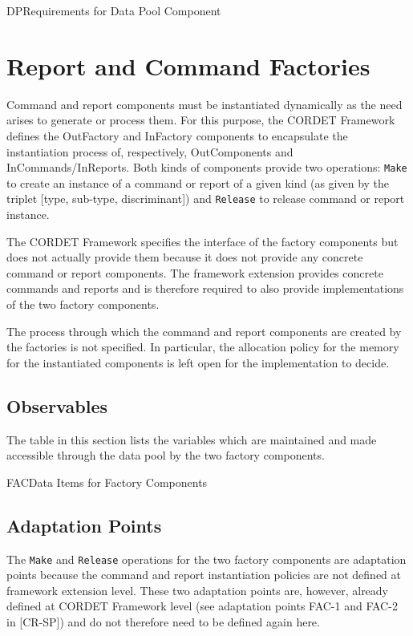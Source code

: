 \documentclass{pnp_article}
\begin{document}
\begin{cr_req}{DP}{Requirements for Data Pool Component}
\end{cr_req}

\section{Report and Command Factories}\label{sec:repCmdFactories}
Command and report components must be instantiated dynamically as the need arises to generate or process them. For this purpose, the CORDET Framework defines the OutFactory and InFactory components to encapsulate the instantiation process of, respectively, OutComponents and InCommands/InReports. Both kinds of components provide two operations: \texttt{Make} to create an instance of a command or report of a given kind (as given by the triplet [type, sub-type, discriminant]) and \texttt{Release} to release command or report instance.

The CORDET Framework specifies the interface of the factory components but does not actually provide them because it does not provide any concrete command or report components. The framework extension provides concrete commands and reports and is therefore required to also provide implementations of the two factory components.

The process through which the command and report components are created by the factories is not specified. In particular, the allocation policy for the memory for the instantiated components is left open for the implementation to decide.

\subsection{Observables}
The table in this section lists the variables which are maintained and made accessible through the data pool by the two factory components.

\begin{cr_obs}{FAC}{Data Items for Factory Components}
\end{cr_obs}

\subsection{Adaptation Points}
The \texttt{Make} and \texttt{Release} operations for the two factory components are adaptation points because the command and report instantiation policies are not defined at framework extension level. These two adaptation points are, however, already defined at CORDET Framework level (see adaptation points FAC-1 and FAC-2 in [CR-SP]) and do not therefore need to be defined again here.
\end{document}
